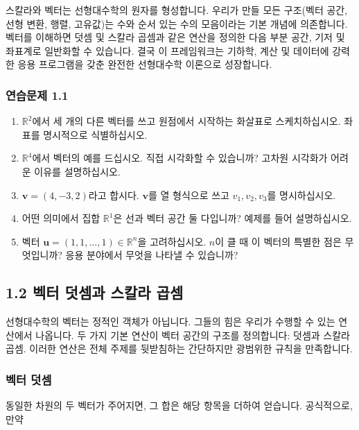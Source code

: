 \documentclass[
  12pt,
  a4paper,
]{article}
\begin{document}
스칼라와 벡터는 선형대수학의 원자를 형성합니다. 우리가 만들 모든 구조(벡터 공간, 선형 변환, 행렬, 고유값)는 수와 순서 있는 수의 모음이라는 기본 개념에 의존합니다. 벡터를 이해하면 덧셈 및 스칼라 곱셈과 같은 연산을 정의한 다음 부분 공간, 기저 및 좌표계로 일반화할 수 있습니다. 결국 이 프레임워크는 기하학, 계산 및 데이터에 강력한 응용 프로그램을 갖춘 완전한 선형대수학 이론으로 성장합니다.

\subsubsection{연습문제 1.1}\label{exercises-11}

\begin{enumerate}
\def\labelenumi{\arabic{enumi}.}
\item
  \(\mathbb{R}^2\)에서 세 개의 다른 벡터를 쓰고 원점에서 시작하는 화살표로 스케치하십시오. 좌표를 명시적으로 식별하십시오.
\item
  \(\mathbb{R}^4\)에서 벡터의 예를 드십시오. 직접 시각화할 수 있습니까? 고차원 시각화가 어려운 이유를 설명하십시오.
\item
  \(\mathbf{v} = (4, -3, 2)\)라고 합시다. \(\mathbf{v}\)를 열 형식으로 쓰고 \(v_1, v_2, v_3\)를 명시하십시오.
\item
  어떤 의미에서 집합 \(\mathbb{R}^1\)은 선과 벡터 공간 둘 다입니까? 예제를 들어 설명하십시오.
\item
  벡터 \(\mathbf{u} = (1,1,\dots,1) \in \mathbb{R}^n\)을 고려하십시오. \(n\)이 클 때 이 벡터의 특별한 점은 무엇입니까? 응용 분야에서 무엇을 나타낼 수 있습니까?
\end{enumerate}

\subsection{1.2 벡터 덧셈과 스칼라 곱셈}\label{12-vector-addition-and-scalar-multiplication}

선형대수학의 벡터는 정적인 객체가 아닙니다. 그들의 힘은 우리가 수행할 수 있는 연산에서 나옵니다. 두 가지 기본 연산이 벡터 공간의 구조를 정의합니다: 덧셈과 스칼라 곱셈. 이러한 연산은 전체 주제를 뒷받침하는 간단하지만 광범위한 규칙을 만족합니다.

\subsubsection{벡터 덧셈}\label{vector-addition}

동일한 차원의 두 벡터가 주어지면, 그 합은 해당 항목을 더하여 얻습니다. 공식적으로, 만약
\end{document}
